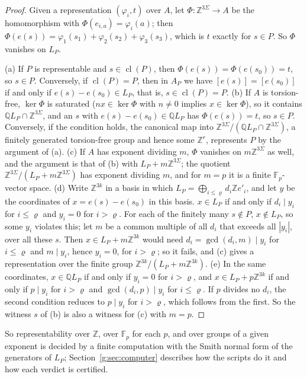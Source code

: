 \documentclass[11pt]{article}
\theoremstyle{definition}
\theoremstyle{remark}
\newcommand{\Z}{\mathbb{Z}}
\newcommand{\Fp}{\mathbb{F}_p}
\newcommand{\Q}{\mathbb{Q}}
\DeclareMathOperator{\cl}{cl}
\begin{document}
\begin{proof}
Given a representation $(\varphi_i,t)$ over $A$, let $\Phi\colon\Z^{3\Sigma}\to A$ be the homomorphism with $\Phi(e_{i,a})=\varphi_i(a)$; then $\Phi(e(s))=\varphi_1(s_1)+\varphi_2(s_2)+\varphi_3(s_3)$, which is $t$ exactly for $s\in P$. So $\Phi$ vanishes on $L_P$.

(a) If $P$ is representable and $s\in\cl(P)$, then $\Phi(e(s))=\Phi(e(s_0))=t$, so $s\in P$. Conversely, if $\cl(P)=P$, then in $A_P$ we have $[e(s)]=[e(s_0)]$ if and only if $e(s)-e(s_0)\in L_P$, that is, $s\in\cl(P)=P$.
(b) If $A$ is torsion-free, $\ker\Phi$ is saturated ($nx\in\ker\Phi$ with $n\ne0$ implies $x\in\ker\Phi$), so it contains $\Q L_P\cap\Z^{3\Sigma}$, and an $s$ with $e(s)-e(s_0)\in\Q L_P$ has $\Phi(e(s))=t$, so $s\in P$. Conversely, if the condition holds, the canonical map into $\Z^{3\Sigma}/(\Q L_P\cap\Z^{3\Sigma})$, a finitely generated torsion-free group and hence some $\Z^r$, represents $P$ by the argument of (a).
(c) If $A$ has exponent dividing $m$, $\Phi$ vanishes on $m\Z^{3\Sigma}$ as well, and the argument is that of (b) with $L_P+m\Z^{3\Sigma}$; the quotient $\Z^{3\Sigma}/(L_P+m\Z^{3\Sigma})$ has exponent dividing $m$, and for $m=p$ it is a finite $\Fp$-vector space.
(d) Write $\Z^{3k}$ in a basis in which $L_P=\bigoplus_{i\le\varrho}d_i\Z e'_i$, and let $y$ be the coordinates of $x=e(s)-e(s_0)$ in this basis. $x\in L_P$ if and only if $d_i\mid y_i$ for $i\le\varrho$ and $y_i=0$ for $i>\varrho$. For each of the finitely many $s\notin P$, $x\notin L_P$, so some $y_i$ violates this; let $m$ be a common multiple of all $d_i$ that exceeds all $|y_i|$, over all these $s$. Then $x\in L_P+m\Z^{3k}$ would need $d_i=\gcd(d_i,m)\mid y_i$ for $i\le\varrho$ and $m\mid y_i$, hence $y_i=0$, for $i>\varrho$; so it fails, and (c) gives a representation over the finite group $\Z^{3k}/(L_P+m\Z^{3k})$.
(e) In the same coordinates, $x\in\Q L_P$ if and only if $y_i=0$ for $i>\varrho$, and $x\in L_P+p\Z^{3k}$ if and only if $p\mid y_i$ for $i>\varrho$ and $\gcd(d_i,p)\mid y_i$ for $i\le\varrho$. If $p$ divides no $d_i$, the second condition reduces to $p\mid y_i$ for $i>\varrho$, which follows from the first. So the witness $s$ of (b) is also a witness for (c) with $m=p$.
\end{proof}

So representability over $\Z$, over $\Fp$ for each $p$, and over groups of a given exponent is decided by a finite computation with the Smith normal form of the generators of $L_P$; Section~\ref{g:sec:computer} describes how the scripts do it and how each verdict is certified.
\end{document}
